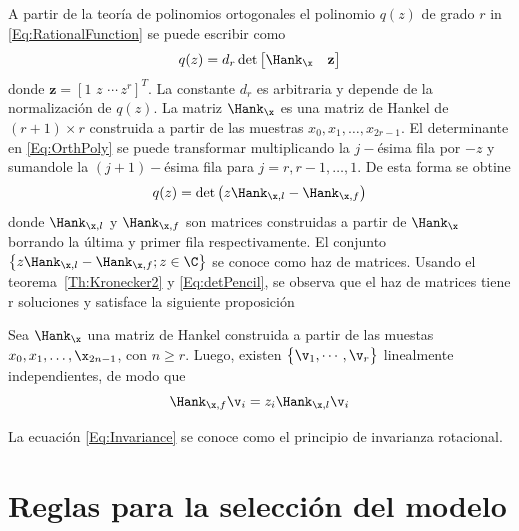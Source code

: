 A partir de la teoría de polinomios ortogonales \cite{Szego1939} el polinomio $q(z)$ de grado $r$ in \eqref{Eq:RationalFunction} se puede escribir como
\begin{equation}
	q(z) = d_r\det\begin{bmatrix} \Hank_{\x} & \mathbf{z}\end{bmatrix}
	\label{Eq:OrthPoly}
\end{equation}
donde $\mathbf{z} = [1\,\, z \,\,\cdots\, z^r]^T$. La constante $d_r$ es arbitraria y depende de la normalización de $q(z)$. La matriz $\Hank_{\x}$ es una matriz de Hankel de $(r+1)\times r$ construida a partir de las muestras $x_0, x_1,\ldots, x_{2r-1}$. El determinante en \eqref{Eq:OrthPoly} se puede transformar multiplicando la $j-$ésima fila por $-z$ y sumandole la $(j+1)-$ésima fila para $j=r,r-1,\ldots,1$. De esta forma se obtine
\begin{equation}
	q(z) = \det\big(z\Hank_{\x,l}-\Hank_{\x,f}\big)
	\label{Eq:detPencil}
\end{equation}
donde $\Hank_{\x,l}$ y $\Hank_{\x,f}$ son matrices construidas a partir de $\Hank_{\x}$ borrando la última y primer fila respectivamente. El conjunto $\big\{z\Hank_{\x,l}-\Hank_{\x,f};z\in\C\big\}$ se conoce como haz de matrices. Usando el teorema~\ref{Th:Kronecker2} y \eqref{Eq:detPencil}, se observa que el haz de matrices tiene r soluciones y satisface la siguiente proposición
\begin{prop}\label{Prop:Invariance}
	Sea $\Hank_{\x}$ una matriz de Hankel construida a partir de las muestas $x_0, x_1,\ldots,\x_{2n-1}$, con $n\geq r$. Luego, existen $\big\{\v_1,\cdots,\v_r\big\}$ linealmente independientes, de modo que
	\begin{equation}
		\Hank_{\x,f}\v_i = z_i\Hank_{\x,l}\v_i 
		\label{Eq:Invariance}
	\end{equation}
\end{prop}
La ecuación \eqref{Eq:Invariance} se conoce como el principio de invarianza rotacional.


\section{Reglas para la selección del modelo}\label{sec:review}


